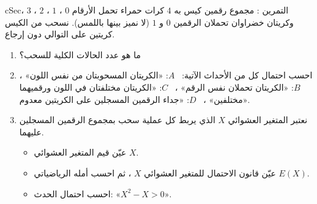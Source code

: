 \documentclass[12pt,a4paper]{article}
\newenvironment{BOX}[2]{\begin{otherlanguage}{english}\begin{arbox}{#1}{#2}}{\end{arbox}\end{otherlanguage}}
\newcounter{exo}
\newenvironment{tamrin}[1]{\stepcounter{exo}\begin{BOX}{cSec}{التمرين \theexo: #1}}{\end{BOX}}
\newenvironment{sq}{\begin{itemize}[leftmargin=2.4em,itemsep=3pt]}{\end{itemize}}
\newcommand{\qa}{\item[(أ)]}\newcommand{\qb}{\item[(ب)]}\newcommand{\qc}{\item[(جـ)]}\newcommand{\qd}{\item[(د)]}\newcommand{\qe}{\item[(هـ)]}
\begin{document}
\begin{tamrin}{مجموع رقمين}
كيس به $4$ كرات حمراء تحمل الأرقام $0$ ، $1$ ، $2$ ، $3$ ، وكريتان خضراوان تحملان الرقمين $0$ و $1$ (لا نميز بينها باللمس). نسحب من الكيس كريتين على التوالي دون إرجاع.
\begin{enumerate}
\item ما هو عدد الحالات الكلية للسحب؟
\item احسب احتمال كل من الأحداث الآتية: \ $A$: «الكريتان المسحوبتان من نفس اللون» ، \ $B$: «الكريتان تحملان نفس الرقم» ، \ $C$: «الكريتان مختلفتان في اللون ورقميهما مختلفين» ، \ $D$: «جداء الرقمين المسجلين على الكريتين معدوم».
\item نعتبر المتغير العشوائي $X$ الذي يربط كل عملية سحب بمجموع الرقمين المسجلين عليهما.
\begin{sq}
\qa عيّن قيم المتغير العشوائي $X$.
\qb عيّن قانون الاحتمال للمتغير العشوائي $X$ ، ثم احسب أمله الرياضياتي $E(X)$.
\qc احسب احتمال الحدث: «$X^2-X>0$».
\end{sq}
\end{enumerate}
\end{tamrin}
\end{document}
